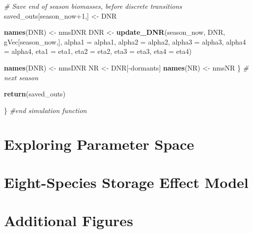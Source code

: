 \documentclass[11pt,]{article}
\newenvironment{Shaded}{\begin{snugshade}}{\end{snugshade}}
\newcommand{\KeywordTok}[1]{\textcolor[rgb]{0.13,0.29,0.53}{\textbf{{#1}}}}
\newcommand{\DataTypeTok}[1]{\textcolor[rgb]{0.13,0.29,0.53}{{#1}}}
\newcommand{\DecValTok}[1]{\textcolor[rgb]{0.00,0.00,0.81}{{#1}}}
\newcommand{\StringTok}[1]{\textcolor[rgb]{0.31,0.60,0.02}{{#1}}}
\newcommand{\CommentTok}[1]{\textcolor[rgb]{0.56,0.35,0.01}{\textit{{#1}}}}
\newcommand{\NormalTok}[1]{{#1}}
\begin{document}
\begin{Shaded}
\begin{Highlighting}[]
    \CommentTok{# Save end of season biomasses, before discrete transitions}
    \NormalTok{saved_outs[season_now}\DecValTok{+1}\NormalTok{,] <-}\StringTok{ }\NormalTok{DNR}
    
    \KeywordTok{names}\NormalTok{(DNR) <-}\StringTok{ }\NormalTok{nmsDNR}
    \NormalTok{DNR        <-}\StringTok{ }\KeywordTok{update_DNR}\NormalTok{(season_now, DNR, gVec[season_now,],}
                             \DataTypeTok{alpha1 =} \NormalTok{alpha1, }\DataTypeTok{alpha2 =} \NormalTok{alpha2, }
                             \DataTypeTok{alpha3 =} \NormalTok{alpha3, }\DataTypeTok{alpha4 =} \NormalTok{alpha4,}
                             \DataTypeTok{eta1 =} \NormalTok{eta1, }\DataTypeTok{eta2 =} \NormalTok{eta2, }\DataTypeTok{eta3 =} \NormalTok{eta3, }\DataTypeTok{eta4 =} \NormalTok{eta4)}
    
    \KeywordTok{names}\NormalTok{(DNR) <-}\StringTok{ }\NormalTok{nmsDNR}
    \NormalTok{NR         <-}\StringTok{ }\NormalTok{DNR[-dormants]  }
    \KeywordTok{names}\NormalTok{(NR)  <-}\StringTok{ }\NormalTok{nmsNR}
  \NormalTok{\} }\CommentTok{# next season}
  
  \KeywordTok{return}\NormalTok{(saved_outs)}
  
\NormalTok{\} }\CommentTok{#end simulation function}
\end{Highlighting}
\end{Shaded}

\newpage{}

\section{Exploring Parameter Space}

\newpage{}

\section{Eight-Species Storage Effect Model}

\newpage{}

\section{Additional Figures}
\end{document}
